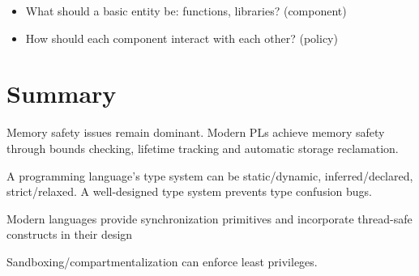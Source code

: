\documentclass[11pt]{article}
\begin{document}
\begin{itemize}
	\item What should a basic entity be: functions, libraries? (component)
	\item How should each component interact with each other? (policy) 
\end{itemize}

\section*{Summary}

Memory safety issues remain dominant. Modern PLs achieve memory safety through bounds checking, lifetime tracking and automatic storage reclamation. 

A programming language's type system can be static/dynamic, inferred/declared, strict/relaxed. A well-designed type system prevents type confusion bugs.

Modern languages provide synchronization primitives and incorporate thread-safe constructs in their design

Sandboxing/compartmentalization can enforce least privileges.
\end{document}
